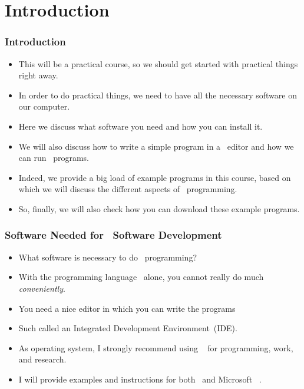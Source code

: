 \documentclass[aspectratio=169,mathserif,notheorems]{beamer}%
\subtitle{Getting Started}%
\begin{document}
%
\startPresentation%
%
\section{Introduction}%
%
\begin{frame}%
\frametitle{Introduction}%
\begin{itemize}%
\item This will be a practical course, so we should get started with practical things right away.%
\item<2-> In order to do practical things, we need to have all the necessary software on our computer.%
\item<3-> Here we discuss what software you need and how you can install it.%
\item<4-> We will also discuss how to write a simple program in a \python\ editor and how we can run \python\ programs.%
\item<5-> Indeed, we provide a big load of example programs in this course, based on which we will discuss the different aspects of \python\ programming.%
\item<6-> So, finally, we will also check how you can download these example programs.%
\end{itemize}%
\end{frame}%
%
\begin{frame}%
\frametitle{Software Needed for \python\ Software Development}%
\begin{itemize}%
\item What software is necessary to do \python\ programming?%
\item<4-> With the programming language \python\ alone, you cannot really do much \emph{conveniently}.%
\item<5-> You need a nice editor in which you can write the programs%
\item<8-> Such  called an Integrated Development Environment~(IDE).%
\item<11-> As operating system, I strongly recommend using \linux~\cite{T1999TLE,B2022ELATCL,H2022LML} for programming, work, and research.%
%
\item<13-> I will provide examples and instructions for both \ubuntu\ and Microsoft \windows~\cite{B2023W1IO}.%
\end{itemize}%
\end{frame}%
%
\end{document}
